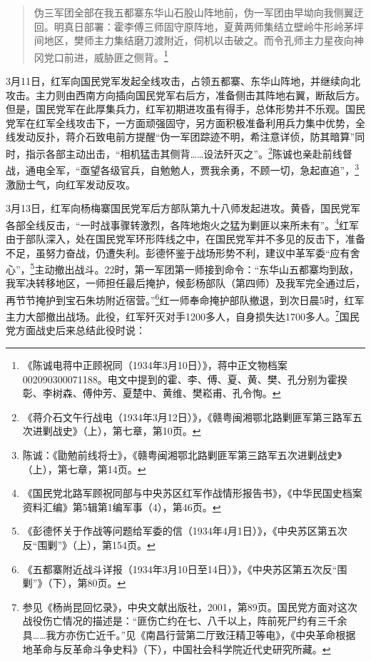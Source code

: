 \begin{quote}

伪三军团全部在我五都寨东华山石股山阵地前，伪一军团由早坳向我侧翼迂回。明真日部署：霍李傅三师固守原阵地，夏黄两师集结立壁岭牛形岭茅坪间地区，樊师主力集结磨刀渡附近，伺机以击破之。而令孔师主力星夜向神冈党口前进，威胁匪之侧背。\footnote{《陈诚电蒋中正顾祝同（1934年3月10日）》，蒋中正文物档案002090300071188。电文中提到的霍、李、傅、夏、黄、樊、孔分别为霍揆彰、李树森、傅仲芳、夏楚中、黄维、樊崧甫、孔令恂。}
\end{quote}


3月11日，红军向国民党军发起全线攻击，占领五都寨、东华山阵地，并继续向北攻击。主力则由西南方向插向国民党军右后方，准备侧击其阵地右翼，断敌后方。但是，国民党军在此厚集兵力，红军初期进攻虽有得手，总体形势并不乐观。国民党军在红军全线攻击下，一方面顽强固守，另方面积极准备利用兵力集中优势，全线发动反扑，蒋介石致电前方提醒“伪一军团踪迹不明，希注意详侦，防其暗算”同时，指示各部主动出击，“相机猛击其侧背……设法歼灭之”。\footnote{《蒋介石文午行战电（1934年3月12日）》，《赣粤闽湘鄂北路剿匪军第三路军五次进剿战史》（上），第七章，第10页。}陈诚也亲赴前线督战，通电全军，“亟望各级官兵，自勉勉人，贾我余勇，不顾一切，急起直追”，\footnote{陈诚：《勖勉前线将士》，《赣粤闽湘鄂北路剿匪军第三路军五次进剿战史》（上），第七章，第14页。}激励士气，向红军发动反攻。


3月13日，红军向杨梅寨国民党军后方部队第九十八师发起进攻。黄昏，国民党军各部全线反击，“一时战事骤转激烈，各阵地炮火之猛为剿匪以来所未有”。\footnote{《国民党北路军顾祝同部与中央苏区红军作战情形报告书》，《中华民国史档案资料汇编》第5辑第1编军事（4），第46页。}红军由于部队深入，处在国民党军环形阵线之中，在国民党军并不多见的反击下，准备不足，虽努力奋战，仍遭失利。彭德怀鉴于战场形势不利，建议中革军委“应有舍心”，\footnote{《彭德怀关于作战等问题给军委的信（1934年4月1日）》，《中央苏区第五次反“围剿”》（上），第154页。}主动撤出战斗。22时，第一军团第一师接到命令：“东华山五都寨均到敌，我军决转移地区，一师担任最后掩护，候彭杨部队（第四师）及我军完全通过后，再节节掩护到宝石朱坊附近宿营。”\footnote{《五都寨附近战斗详报（1934年3月10日至14日）》，《中央苏区第五次反“围剿”》（下），第80页。}红一师奉命掩护部队撤退，到次日晨5时，红军主力大部撤出战场。此役，红军歼灭对手1200多人，自身损失达1700多人。\footnote{参见《杨尚昆回忆录》，中央文献出版社，2001，第89页。国民党方面对这次战役伤亡情况的描述是：“匪伤亡约在七、八千以上，阵前死尸约有三千余具……我方亦伤亡近千。”见《南昌行营第二厅致汪精卫等电》，《中央革命根据地革命与反革命斗争史料》（下），中国社会科学院近代史研究所藏。}国民党方面战史后来总结此役时说：

